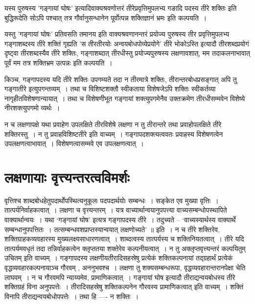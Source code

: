 				यस्य पुरुषस्य ’गङ्गायां घोषः’ इत्यादिवाक्यश्रवणोत्तरं तीरेप्रवृत्तिमुपलभ्य गङादि पदस्य तीरे शक्तिः इति बुद्धिरूदेति सोऽपि पश्चात् तत्र गौर्वानुसन्धानेन पूर्वोत्पन्न शक्तिज्ञानं भ्रमः इति कल्पयति~।
	
				यस्तु ’गङ्गायां घोषः’ प्रतिवसति तमानय इति वाक्यश्रवणानन्तरं प्रयोज्य पुरुषस्य तीर प्रवृत्तिमुपलभ्य  गङ्गाशब्दस्य तीरे शक्तिं गृह्यति ’स तीरतीरयोः अन्वयबोधपोव्येप्रयोगे’ तीरे भोकोऽस्ति इत्यादौ तीरशब्दप्रयोगं दृष्ट्वा तीरशब्दस्यैव तीरे शक्तिः, गङ्गाशब्दात् तीरधीस्तु प्रयोज्यपुरुषस्य लक्षणावशात्, मम तदाकलनाभावात् पूर्वं मम तत्र  शक्तिभ्रम उत्पन्नः इति कल्पयति~।
	
				किञ्च, गङ्गापदस्य यदि तीरे शक्तिः उपगम्यते तदा न तीरमात्रे शक्तिः, तीरान्तरबोधप्रसङ्गात् अपि तु गङ्गातीरे इत्युपगन्तव्यम्~। तथा च विशिष्टशक्तौ स्वीकताया विशेषजेऽपि शक्तिः स्वीकर्तव्या नागृहीतविशेषणान्यायात्~। तथा च  विशेषणीभूत गङ्गायां शक्त्युपगमेनैव उक्तक्रमेण तीरधीसम्मवेन विशेष्ये नीरशक्त्युपगमो व्यर्थः~।

				न च लक्षणापक्षे यथा प्रवाहेण उपलक्षिते तीरविशेषे लक्षणा न तु तीरान्तरे तथा  प्रवाहोपलक्षिते तीरे शक्तिरस्तु~। न तु प्रवाहविशिष्टतीरे इति वाच्यम्~। गङ्गापदशक्त्यत्ववतः प्रवाहस्य विशेषणत्वेन उपलक्षणत्वाभावात्~। विशेषणत्वासम्मवे एव उपलक्षणत्वात्~।

	\section{लक्षणायाः वृत्त्यन्तरत्वविमर्शः}
	
			वृत्तिश्च शाब्दबोधहेतुपदार्थोपस्थित्यनुकूलः पदपदार्थयोः सम्बन्धः~। सङ्केत एव मुख्या वृत्तिः~। तात्पर्यनिर्वाहकत्वात्~। लक्षणा च वृत्त्यन्तरम्~। यत्र वाच्यार्थान्वयानुपपत्त्या वाच्यसम्बन्धोपस्थापिते वाक्यार्थान्वयः~। यथा ‘गङ्गायां घोष’ इत्यत्र गङ्गापदस्य तीरे~। तदुच्यते – ‘वाच्यस्यार्थस्य वाक्यार्थे सम्बन्धानुपपत्तितः~। तत्सम्बन्धवशप्राप्तस्यान्वयात् लक्षणोच्यते’ ॥ इति~। न च तीरे शक्तिरेव, शक्तिग्राहकव्यवहारस्य मुख्यलक्ष्यसाधारणत्वात्~। शाब्दत्वस्य तात्पर्यस्य च शक्तिनियतत्वात्~। तीरे यदि तात्पर्यमवधृतं तदा तन्निर्वाहकत्वेन क्लृप्ततया शक्तेरेव कल्पनीयत्वात्~। न तु अक्लृप्तवृत्त्यन्तरं कल्पयितुम् उचितम् इति वाच्यम्~। गङ्गापदस्य लक्षणीयतीरादिसहस्रेषु प्रत्येकं शक्तिकल्पनायां तद्ग्रहार्थं प्रत्येकं वृद्धव्यवहारकल्पनायाञ्च गौरवम् , अननुभवश्च~। लक्षणा तु शक्यसम्बन्धरूपा, वृद्धव्यवहारान्तरानपेक्षा चेति लाघवम्~। न च गौरवमपि न्याय्यमेव, प्रामाणिकत्वात्~। गङ्गायां घोष इत्यादौ तीराद्यन्वयबोधस्य तीरे शक्तिग्रहं विना अनुपपत्तेः~। तीरादिसहस्रेषु शक्तिकल्पनेन गौरवस्य प्रामाणिकत्वात् इति वाच्यम्~। शक्तिं विनापि तीराद्यन्वयबोधोपपत्तेः~। तथा हि ---- न शक्तिः~। 

